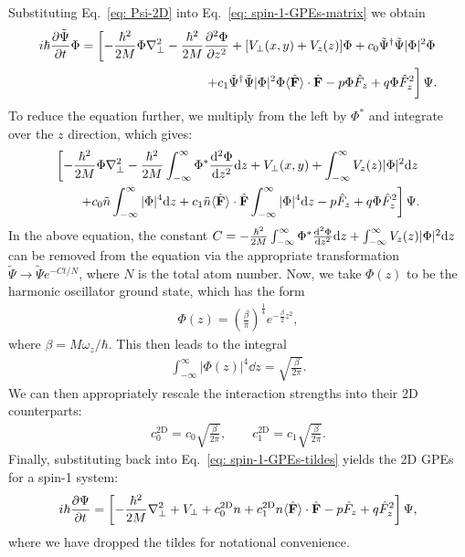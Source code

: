 Substituting Eq.~\eqref{eq: Psi-2D} into Eq.~\eqref{eq: spin-1-GPEs-matrix} we
obtain
\begin{equation}
\begin{split}
    i\hbar\pdv{\tilde{\Psi}}{t}\Phi = \left[
        -\frac{\hbar^2}{2M}\Phi\nabla_\perp^2
        - \frac{\hbar^2}{2M}\pdv[2]{\Phi}{z} + [V_\perp(x, y) + V_z(z)]\Phi
        +c_0\tilde{\Psi}^\dagger\tilde{\Psi}|\Phi|^2\Phi\right. \\
        \left.+c_1\tilde{\Psi}^\dagger\tilde{\Psi}|\Phi|^2\Phi
        \langle\hat{\vb{F}}\rangle \cdot \hat{\vb{F}}
        -p\Phi\hat{F}_z + q\Phi\hat{F}_z^2 \vphantom{\int_1^2}\right]\Psi.
\end{split}
\end{equation}
To reduce the equation further, we multiply from the left by \(\Phi^*\) and
integrate over the \(z\) direction, which gives:
\begin{equation}\label{eq: spin-1-GPEs-tildes}
\begin{split}
    \left[
        -\frac{\hbar^2}{2M}\Phi\nabla_\perp^2
        - \frac{\hbar^2}{2M}\int_{-\infty}^{\infty}\Phi^*\dv[2]{\Phi}{z} \dd z
        + V_\perp(x, y) + \int_{-\infty}^{\infty} V_z(z)|\Phi|^2 \dd z\right. \\
        \left.+c_0\tilde{n}\int_{-\infty}^{\infty}|\Phi|^4 \dd z
        +c_1\tilde{n}\langle\hat{\vb{F}}\rangle \cdot \hat{\vb{F}}
        \int_{-\infty}^{\infty}|\Phi|^4 \dd z
        -p\hat{F}_z + q\Phi\hat{F}_z^2 \right]\Psi.
\end{split}
\end{equation}
In the above equation, the constant \(C =
-\frac{\hbar^2}{2M}\int_{-\infty}^{\infty}\Phi^*\dv[2]{\Phi}{z} \dd z
+ \int_{-\infty}^{\infty} V_z(z)|\Phi|^2 \dd z\) can be removed from the
equation via the appropriate transformation \(\tilde{\Psi} \rightarrow
\tilde{\Psi}e^{-Ct/N}\), where \(N\) is the total atom number.
Now, we take \(\Phi(z)\) to be the harmonic oscillator ground state, which has
the form
\begin{align}
    \Phi(z) =
    {\left(\frac{\beta}{\pi}\right)}^{\frac{1}{4}}e^{-\frac{\beta}{2}z^2},
\end{align}
where \(\beta = M\omega_z/\hbar \).
This then leads to the integral
\begin{align}
    \int_{-\infty}^{\infty}|\Phi(z)|^4 \dd z = \sqrt{\frac{\beta}{2\pi}}.
\end{align}
We can then appropriately rescale the interaction strengths into their 2D
counterparts:
\begin{align}
    c_0^\text{2D} = c_0\sqrt{\frac{\beta}{2\pi}}, \qquad
    c_1^\text{2D} = c_1\sqrt{\frac{\beta}{2\pi}}.
\end{align}
Finally, substituting back into Eq.~\eqref{eq: spin-1-GPEs-tildes} yields the
2D GPEs for a spin-1 system:
\begin{align}
    i\hbar\pdv{\Psi}{t} = \left[-\frac{\hbar^2}{2M}\nabla_\perp^2 + V_\perp
    + c_0^\text{2D}n + c_1^\text{2D}n\langle\hat{\vb{F}}\rangle \cdot \hat{\vb{F}}
    -p\hat{F}_z + q\hat{F}_z^2\right]\Psi,
\end{align}
where we have dropped the tildes for notational convenience.

